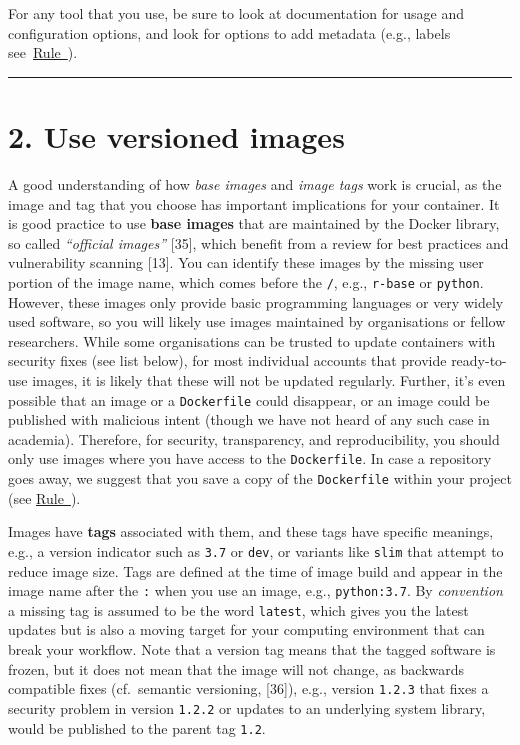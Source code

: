 \documentclass[10pt,letterpaper]{article}
\begin{document}
For any tool that you use, be sure to look at documentation for usage
and configuration options, and look for options to add metadata (e.g.,
labels see~\hyperref[{rule:document}]{Rule~}).

\begin{center}\rule{0.5\linewidth}{0.5pt}\end{center}

\hypertarget{use-versioned-images}{%
\section*{2. Use versioned images}\label{use-versioned-images}}

  \label{rule:base} 

A good understanding of how \emph{base images} and \emph{image tags}
work is crucial, as the image and tag that you choose has important
implications for your container. It is good practice to use \textbf{base
images} that are maintained by the Docker library, so called
\emph{``official images''} {[}35{]}, which benefit from a review for
best practices and vulnerability scanning {[}13{]}. You can identify
these images by the missing user portion of the image name, which comes
before the \texttt{/}, e.g., \texttt{r-base} or \texttt{python}.
However, these images only provide basic programming languages or very
widely used software, so you will likely use images maintained by
organisations or fellow researchers. While some organisations can be
trusted to update containers with security fixes (see list below), for
most individual accounts that provide ready-to-use images, it is likely
that these will not be updated regularly. Further, it's even possible
that an image or a \texttt{Dockerfile} could disappear, or an image
could be published with malicious intent (though we have not heard of
any such case in academia). Therefore, for security, transparency, and
reproducibility, you should only use images where you have access to the
\texttt{Dockerfile}. In case a repository goes away, we suggest that you
save a copy of the \texttt{Dockerfile} within your project (see
\hyperref[{rule:mount}]{Rule~}).

Images have \textbf{tags} associated with them, and these tags have
specific meanings, e.g., a version indicator such as \texttt{3.7} or
\texttt{dev}, or variants like \texttt{slim} that attempt to reduce
image size. Tags are defined at the time of image build and appear in
the image name after the \texttt{:} when you use an image, e.g.,
\texttt{python:3.7}. By \emph{convention} a missing tag is assumed to be
the word \texttt{latest}, which gives you the latest updates but is also
a moving target for your computing environment that can break your
workflow. Note that a version tag means that the tagged software is
frozen, but it does not mean that the image will not change, as
backwards compatible fixes (cf.~semantic versioning, {[}36{]}), e.g.,
version \texttt{1.2.3} that fixes a security problem in version
\texttt{1.2.2} or updates to an underlying system library, would be
published to the parent tag \texttt{1.2}.
\end{document}
